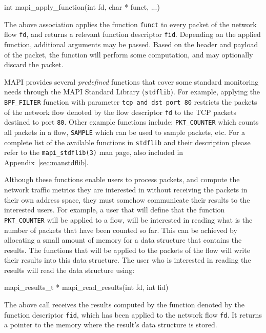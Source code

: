 \documentclass[a4paper, 11pt]{article}
\newenvironment{code}{\small\verbatim}{\endverbatim}
\begin{document}
\begin{code}
int mapi_apply_function(int fd, char * funct, ...)
\end{code}  

The above association applies the function {\tt funct} 
to every packet of the network flow {\tt fd},
and returns a relevant function descriptor {\tt fid}.
Depending on the applied function, additional arguments may be passed.
Based on the header and payload of the packet, the function will
perform some computation, and may optionally discard the packet.

MAPI provides several 
{\em predefined} functions 
that cover some standard monitoring needs through the MAPI Standard Library
({\tt stdflib}).
For example, applying the {\tt BPF\_FILTER} function with parameter
{\tt tcp and dst port 80} restricts the packets of the network flow 
denoted by the flow descriptor {\tt fd}
to the TCP packets destined to port {\tt 80}. 
Other example functions include:
{\tt PKT\_COUNTER} which counts all packets in a flow,
{\tt SAMPLE} which can be used to sample packets, etc.
For a complete list of the available functions
in {\tt stdflib} and their description please refer to the
{\tt mapi\_stdflib(3)} man page, also included in Appendix~\ref{sec:manstdflib}.

Although these functions enable users to process packets,
and compute the network traffic metrics they are interested in
without receiving the packets in their own address space,
they must somehow communicate their results to the interested users.
For example, a user that will define that the function
{\tt PKT\_COUNTER}  will be applied to a flow,
will be interested in reading what is the number of packets that have
been counted so far.
This can be achieved by allocating a small amount of memory
for a data structure that contains the results.
The functions that will be applied to the packets
of the flow will write their results into this data structure.
The user who is interested in reading the results will read the
data structure using:

\begin{code}  
mapi_results_t * mapi_read_results(int fd, int fid)
\end{code}

The above call receives the results computed by the function
denoted by the function descriptor {\tt fid},
which has been applied to the network flow {\tt fd}.
It returns a pointer to the memory where the result's data structure is stored.
\end{document}

